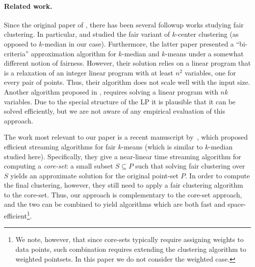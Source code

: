 \paragraph{Related work.} Since the original paper of %
\cite{chierichetti2017fair}, there has been several followup works studying fair clustering. In  particular, \cite{rosner18privacy} and \cite{bercea2018cost} studied the fair variant of $k$-center clustering (as opposed to $k$-median in our case). Furthermore, the latter paper presented a ``bi-criteria'' approximation algorithm for $k$-median and $k$-means under a somewhat different notion of fairness. However, their solution relies on a  linear program that is a relaxation of an integer linear program with at least $n^2$ variables, one for every pair of points. Thus, their algorithm does not scale well with the input size.
Another algorithm proposed in \cite{fairclustering19}, requires solving a linear program with $nk$ variables. Due to the special structure of the LP it is plausible that it can be solved efficiently, but we are not aware of any empirical evaluation of this approach.


The work most relevant to our paper is a recent manuscript by~\cite{schmidt2018fair}, which proposed efficient streaming algorithms for fair $k$-means (which is similar to  $k$-median studied here). Specifically, they give a near-linear time streaming algorithm for computing a {\em core-set}: a small subset $S \subseteq P$ such that solving fair clustering over $S$ yields an approximate solution for the original point-set $P$. 
In order to compute the final clustering, however, they still need to apply a fair clustering algorithm to the core-set. Thus, our approach is complementary to the core-set approach, and the two can be combined to yield algorithms which are both fast and space-efficient\footnote{We note, however, that since core-sets typically require assigning weights to data points, such combination requires extending the clustering algorithm to weighted pointsets. In this paper we do not consider the weighted case.}.

